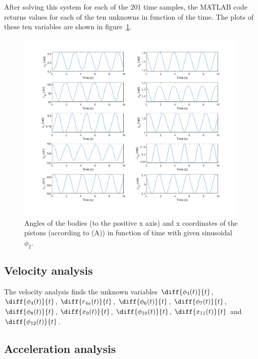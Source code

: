 \documentclass[a4paper]{article}
\begin{document}
After solving this system for each of the 201 time samples, the MATLAB code returns values for each of the ten unknowns in function of the time. The plots of these ten variables are shown in figure~\ref{fig:kinpos}.

\begin{figure}
	\centering
	
	\includegraphics[width = \textwidth]{kinpos.png}
	
	\caption{Angles of the bodies (to the positive x axis) and x coordinates of the pistons (according to (A)) in function of time with given sinusoidal \(\phi_2\).}
	\label{fig:kinpos}
	
\end{figure}



\subsection{Velocity analysis}

The velocity analysis finds the unknown variables \(\diff{\phi_3(t)}{t}\), \(\diff{\phi_4(t)}{t}\), \(\diff{r_{4a}(t)}{t}\), \(\diff{\phi_6(t)}{t}\), \(\diff{\phi_7(t)}{t}\), \(\diff{\phi_8(t)}{t}\), \(\diff{x_9(t)}{t}\), \(\diff{\phi_{10}(t)}{t}\), \(\diff{x_{11}(t)}{t}\) and \(\diff{\phi_{12}(t)}{t}\).

\subsection{Acceleration analysis}
\end{document}
